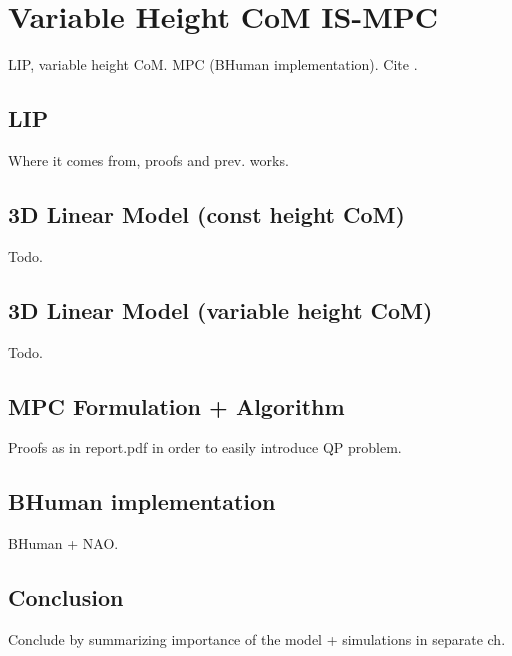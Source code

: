 \chapter{Variable Height CoM IS-MPC}
LIP, variable height CoM. MPC (BHuman implementation). Cite
\cite{SYROCO18}.

\section{LIP}
Where it comes from, proofs and prev. works.

\section{3D Linear Model (const height CoM)}
Todo.

\section{3D Linear Model (variable height CoM)}
Todo.

\section{MPC Formulation + Algorithm}
Proofs as in report.pdf in order to easily introduce QP problem.

\section{BHuman implementation}
BHuman + NAO.

\section{Conclusion}
Conclude by summarizing importance of the model + simulations in
separate ch.

